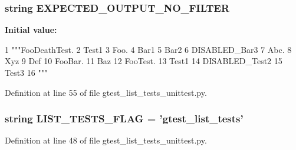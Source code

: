 \hypertarget{namespacegtest__list__tests__unittest_a19fc0aef12493607223baffd69f18b1b}{
\subsubsection[{\-E\-X\-P\-E\-C\-T\-E\-D\-\_\-\-O\-U\-T\-P\-U\-T\-\_\-\-N\-O\-\_\-\-F\-I\-L\-T\-E\-R}]{\setlength{\rightskip}{0pt plus 5cm}string {\bf \-E\-X\-P\-E\-C\-T\-E\-D\-\_\-\-O\-U\-T\-P\-U\-T\-\_\-\-N\-O\-\_\-\-F\-I\-L\-T\-E\-R}}}\label{d1/d4f/namespacegtest__list__tests__unittest_a19fc0aef12493607223baffd69f18b1b}
{\bfseries \-Initial value\-:}
\begin{DoxyCode}
1 """FooDeathTest.
2   Test1
3 Foo.
4   Bar1
5   Bar2
6   DISABLED_Bar3
7 Abc.
8   Xyz
9   Def
10 FooBar.
11   Baz
12 FooTest.
13   Test1
14   DISABLED_Test2
15   Test3
16 """
\end{DoxyCode}


\-Definition at line 55 of file gtest\-\_\-list\-\_\-tests\-\_\-unittest.\-py.

\hypertarget{namespacegtest__list__tests__unittest_a6bd797257f4db78c152b6e62341177db}{
\subsubsection[{\-L\-I\-S\-T\-\_\-\-T\-E\-S\-T\-S\-\_\-\-F\-L\-A\-G}]{\setlength{\rightskip}{0pt plus 5cm}string {\bf \-L\-I\-S\-T\-\_\-\-T\-E\-S\-T\-S\-\_\-\-F\-L\-A\-G} = 'gtest\-\_\-list\-\_\-tests'}}\label{d1/d4f/namespacegtest__list__tests__unittest_a6bd797257f4db78c152b6e62341177db}


\-Definition at line 48 of file gtest\-\_\-list\-\_\-tests\-\_\-unittest.\-py.


